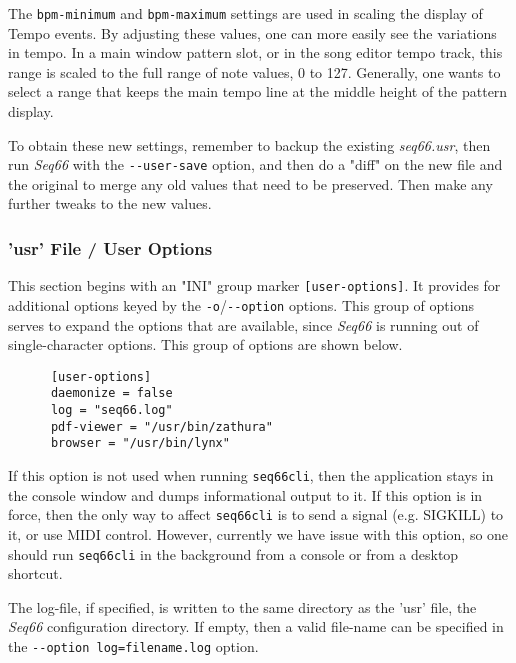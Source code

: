    The \texttt{bpm-minimum} and \texttt{bpm-maximum} settings
   are used in scaling the display of Tempo events.
   By adjusting these values, one can more easily see the variations in
   tempo.  In a main window pattern slot, or in the song editor tempo track,
   this range is scaled to the full range of note values, 0 to 127.
   Generally, one wants to select a range that keeps the main tempo line at
   the middle height of the pattern display.

   To obtain these new settings, remember to backup the existing
   \textsl{seq66.usr}, then run \textsl{Seq66} with the
   \texttt{-{}-user-save} option, and then do a "diff" on the new file and the
   original to merge any old values that need to be preserved.  Then make any
   further tweaks to the new values.

\subsubsection{'usr' File / User Options}
\label{subsubsec:usr_file_user_options}

   This section begins with an
   "INI" group marker \texttt{[user-options]}.
   It provides for additional options keyed by the
   \texttt{-o}/\texttt{-{}-option} options.
   This group of options serves to expand the options that are available, since
   \textsl{Seq66} is running out of single-character options.
   This group of options are shown below.

   \begin{verbatim}
      [user-options]
      daemonize = false
      log = "seq66.log"
      pdf-viewer = "/usr/bin/zathura"
      browser = "/usr/bin/lynx"
   \end{verbatim}

   If this option is not used when running \texttt{seq66cli}, then the
   application stays in the console window and dumps informational output to
   it.  If this option is in force, then the only way to affect
   \texttt{seq66cli} is to send a signal (e.g. SIGKILL) to it, or use
   MIDI control.
   However, currently we have issue with this option, so one should run
   \texttt{seq66cli} in the background from a console or from a desktop shortcut.

   The log-file, if specified, is written to the same directory as the 'usr'
   file, the \textsl{Seq66} configuration directory.
   If empty, then a valid file-name can be specified
   in the \texttt{-{}-option log=filename.log} option.

